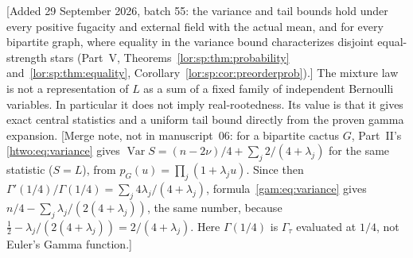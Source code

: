 \documentclass[11pt]{article}
\numberwithin{equation}{section}
\theoremstyle{definition}
\newcommand{\Var}{\operatorname{Var}}
\begin{document}
[Added 29 September 2026, batch 55: the variance and tail bounds hold
under every positive fugacity and external field with the actual mean, and
for every bipartite graph, where equality in the variance bound
characterizes disjoint equal-strength stars (Part~V,
Theorems~\ref{lor:sp:thm:probability} and~\ref{lor:sp:thm:equality},
Corollary~\ref{lor:sp:cor:preorderprob}).]
The mixture law is not a representation of $L$ as a sum of a fixed family
of independent Bernoulli variables. In particular it does not imply
real-rootedness. Its value is that it gives exact central statistics and a
uniform tail bound directly from the proven gamma expansion. [Merge note,
not in manuscript~06: for a bipartite cactus $G$, Part~II's
\eqref{htwo:eq:variance} gives $\Var S=(n-2\nu)/4+\sum_j2/(4+\lambda_j)$ for
the same statistic ($S=L$), from $p_G(u)=\prod_j(1+\lambda_ju)$. Since then
$\Gamma'(1/4)/\Gamma(1/4)=\sum_j4\lambda_j/(4+\lambda_j)$,
formula~\eqref{gam:eq:variance} gives
$n/4-\sum_j\lambda_j/(2(4+\lambda_j))$, the same number, because
$\tfrac12-\lambda_j/(2(4+\lambda_j))=2/(4+\lambda_j)$. Here
$\Gamma(1/4)$ is $\Gamma_\tau$ evaluated at $1/4$, not Euler's Gamma
function.]
\end{document}
